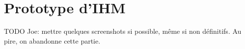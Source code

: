 
\section{Prototype d'IHM}

TODO Joe: mettre quelques screenshots si possible, même si non définitifs. Au pire, on abandonne cette partie.


